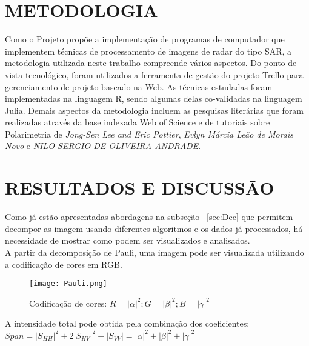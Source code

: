 \documentclass[a4paper,12pt]{article}
\begin{document}

\section{METODOLOGIA}
\label{sec:Met}

Como o Projeto propõe a implementação de programas de computador que implementem técnicas de processamento de imagens de radar do tipo SAR, a  metodologia utilizada neste trabalho compreende vários aspectos. Do ponto de vista tecnológico, foram utilizados a ferramenta de gestão do projeto Trello para gerenciamento de projeto baseado na Web. As técnicas estudadas foram implementadas na linguagem R, sendo algumas delas co-validadas na linguagem Julia.
Demais aspectos da metodologia incluem as pesquisas literárias que foram realizadas através da base indexada Web of Science e de tutoriais sobre Polarimetria de \emph{Jong-Sen Lee and Eric Pottier}, \emph{Evlyn Márcia Leão de Morais Novo} e \emph{NILO SERGIO DE OLIVEIRA ANDRADE}. 

\section{RESULTADOS E DISCUSSÃO}
\label{sec:Result}

Como já estão apresentadas abordagens na subseção ~\ref{sec:Dec} que permitem decompor as imagem usando diferentes algoritmos e os dados já processados, há necessidade de mostrar como podem ser visualizados e analisados. \\

A partir da decomposição de Pauli, uma imagem pode ser visualizada utilizando a codificação de cores em RGB. \\

\begin{figure}[H]
	\centering
	\texttt{[image: Pauli.png]}
	\caption{Codificação de cores: $R=|\alpha|^2; G=|\beta|^2; B=|\gamma|^2$}
	\label{fig:Pauli}
\end{figure}

A intensidade total pode obtida pela combinação dos coeficientes: \\

$Span = |S_{HH}|^2+2|S_{HV}|^2+|S_{VV}|=|\alpha|^2+|\beta|^2+|\gamma|^2$\\
\end{document}
